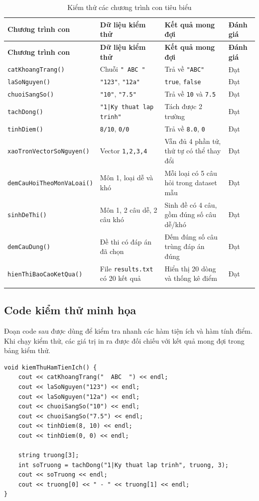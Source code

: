 \documentclass[12pt,a4paper]{article}
\begin{document}
\begin{longtable}{|p{3.8cm}|p{4.1cm}|p{4.2cm}|p{2cm}|}
\hline
\textbf{Chương trình con} & \textbf{Dữ liệu kiểm thử} & \textbf{Kết quả mong đợi} & \textbf{Đánh giá} \\
\hline
\endfirsthead
\hline
\textbf{Chương trình con} & \textbf{Dữ liệu kiểm thử} & \textbf{Kết quả mong đợi} & \textbf{Đánh giá} \\
\hline
\endhead
\texttt{catKhoangTrang()} & Chuỗi \texttt{"  ABC  "} & Trả về \texttt{"ABC"} & Đạt \\
\hline
\texttt{laSoNguyen()} & \texttt{"123"}, \texttt{"12a"} & \texttt{true}, \texttt{false} & Đạt \\
\hline
\texttt{chuoiSangSo()} & \texttt{"10"}, \texttt{"7.5"} & Trả về \texttt{10} và \texttt{7.5} & Đạt \\
\hline
\texttt{tachDong()} & \texttt{"1|Ky thuat lap trinh"} & Tách được 2 trường & Đạt \\
\hline
\texttt{tinhDiem()} & \texttt{8/10}, \texttt{0/0} & Trả về \texttt{8.0}, \texttt{0} & Đạt \\
\hline
\texttt{xaoTronVectorSoNguyen()} & Vector \texttt{1,2,3,4} & Vẫn đủ 4 phần tử, thứ tự có thể thay đổi & Đạt \\
\hline
\texttt{demCauHoiTheoMonVaLoai()} & Môn 1, loại dễ và khó & Mỗi loại có 5 câu hỏi trong dataset mẫu & Đạt \\
\hline
\texttt{sinhDeThi()} & Môn 1, 2 câu dễ, 2 câu khó & Sinh đề có 4 câu, gồm đúng số câu dễ/khó & Đạt \\
\hline
\texttt{demCauDung()} & Đề thi có đáp án đã chọn & Đếm đúng số câu trùng đáp án đúng & Đạt \\
\hline
\texttt{hienThiBaoCaoKetQua()} & File \texttt{results.txt} có 20 kết quả & Hiển thị 20 dòng và thống kê điểm & Đạt \\
\hline
\caption{Kiểm thử các chương trình con tiêu biểu}
\end{longtable}

\subsection{Code kiểm thử minh họa}

Đoạn code sau được dùng để kiểm tra nhanh các hàm tiện ích và hàm tính điểm. Khi chạy kiểm thử, các giá trị in ra được đối chiếu với kết quả mong đợi trong bảng kiểm thử.

\begin{lstlisting}[style=cppstyle, caption={Code kiểm thử một số chương trình con}]
void kiemThuHamTienIch() {
    cout << catKhoangTrang("  ABC  ") << endl;
    cout << laSoNguyen("123") << endl;
    cout << laSoNguyen("12a") << endl;
    cout << chuoiSangSo("10") << endl;
    cout << chuoiSangSo("7.5") << endl;
    cout << tinhDiem(8, 10) << endl;
    cout << tinhDiem(0, 0) << endl;

    string truong[3];
    int soTruong = tachDong("1|Ky thuat lap trinh", truong, 3);
    cout << soTruong << endl;
    cout << truong[0] << " - " << truong[1] << endl;
}
\end{lstlisting}
\end{document}
